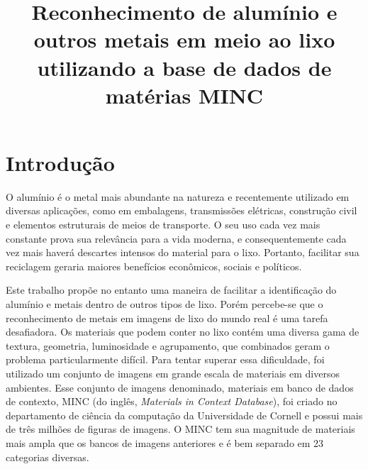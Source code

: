 \documentclass[conference, compsoc, 12pt]{IEEEtran}
\begin{document}
%
\title{Reconhecimento de alumínio e outros metais em meio ao lixo utilizando a base de dados de matérias MINC}

\author{
\and
{}
}

\maketitle


\IEEEpeerreviewmaketitle

\begin{abstract}

\end{abstract}


\section{Introdução}

O alumínio é o metal mais abundante na natureza e recentemente utilizado em diversas aplicações, como em embalagens, transmissões elétricas, construção civil e elementos estruturais de meios de transporte. O seu uso cada vez mais constante prova sua relevância para a vida moderna, e consequentemente cada vez mais haverá descartes intensos do material para o lixo. Portanto, facilitar sua reciclagem geraria maiores benefícios econômicos, sociais e políticos.

Este trabalho propõe no entanto uma maneira de facilitar a identificação do alumínio e metais dentro de outros tipos de lixo. Porém percebe-se que o reconhecimento de metais em imagens de lixo do mundo real é uma tarefa desafiadora. Os materiais que podem conter no lixo contém uma diversa gama de textura, geometria, luminosidade e agrupamento, que combinados geram o problema particularmente difícil. Para tentar superar essa dificuldade, foi utilizado um conjunto de imagens em grande escala de materiais em diversos ambientes. Esse conjunto de imagens denominado, materiais em banco de dados de contexto, MINC (do inglês, \textit{Materials in Context Database}), foi criado no departamento de ciência da computação da Universidade de Cornell e possui mais de três milhões de figuras de imagens. O MINC tem sua magnitude de materiais mais ampla que os bancos de imagens anteriores e é bem separado em 23 categorias diversas.
\end{document}
